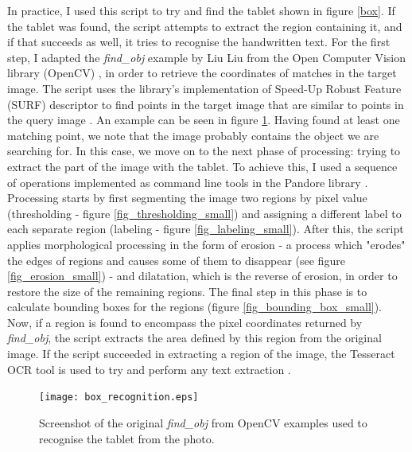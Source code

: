 \documentclass [12pt,a4paper]{report}
\begin{document}
In practice, I used this script to try and find the tablet shown in figure \ref{box}. If the tablet was found, the script attempts to extract the region containing it, and if that succeeds as well, it tries to recognise the handwritten text. For the first step, I adapted the \textit{find\_obj} example by Liu Liu from the Open Computer Vision library (OpenCV) \cite{opencv}, in order to retrieve the coordinates of matches in the target image. The script uses the library's implementation of Speed-Up Robust Feature (SURF) descriptor to find points in the target image that are similar to points in the query image \cite{bay2006surf}. An example can be seen in figure \ref{box_recognition}. Having found at least one matching point, we note that the image probably contains the object we are searching for. In this case, we move on to the next phase of processing: trying to extract the part of the image with the tablet.
To achieve this, I used a sequence of operations implemented as command line tools in the Pandore library \cite{pandore}. Processing starts by first segmenting the image two regions by pixel value (thresholding - figure \ref{fig_thresholding_small}) and assigning a different label to each separate region (labeling - figure \ref{fig_labeling_small}). After this, the script applies morphological processing in the form of erosion - a process which "erodes" the edges of regions and causes some of them to disappear (see figure \ref{fig_erosion_small}) - and dilatation, which is the reverse of erosion, in order to restore the size of the remaining regions. The final step in this phase is to calculate bounding boxes for the regions (figure \ref{fig_bounding_box_small}). Now, if a region is found to encompass the pixel coordinates returned by \textit{find\_obj}, the script extracts the area defined by this region from the original image.
If the script succeeded in extracting a region of the image, the Tesseract OCR tool is used to try and perform any text extraction \cite{tesseract}. 


\begin{center}
\begin{figure}[h]
\centering
\texttt{[image: box\_recognition.eps]} %
\caption{Screenshot of the original \textit{find\_obj} from OpenCV examples used to recognise the tablet from the photo.}
\label{box_recognition}
\end{figure}
\end{center}
\end{document}
